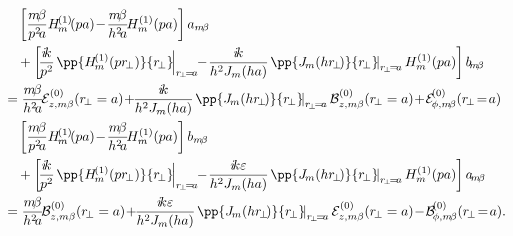 \documentclass[]{report}
\begin{document}
\begin{align}
&\quad \left[\frac{m\! \beta}{p^2\! a} H\!_m^{(1)}\!(pa) \!-\! \frac{m\! \beta}{h^2\! a}\!H_m^{(1)}(pa) \right] a_{m\!\beta}\nonumber\\
&\quad +\left[\! \frac{i\!k}{p^2}\! \left. \pp{H\!_m^{( 1 )}(p r\!_\perp)}{r\!_\perp}\! \right|_{r\!_\perp\! =\! a}\!\!-\! \frac{i\!k}{h^2J_m(ha)}\! \left. \pp{J\!_m(h r\!_\perp \!)}{r\!_\perp}\! \right|_{r\!_\perp\! =\! a} H_m^{(1)}(pa) \right]b\!_{m\!\beta} \nonumber\\
&= \frac{m\! \beta}{h^2\! a}\! \mathcal{E}_{z,m\beta}^{(0)}(r\!_\perp =a ) \!+\! \! \frac{i\!k}{h^2J_m(ha)}\! \left. \pp{J\!_m(h r\!_\perp \!)}{r\!_\perp}\! \right|_{r\!_\perp\! =\! a}\mathcal{B}_{z,m\beta}^{(0)}(r\!_\perp =a )  \!+\!\mathcal{E}\! _{\phi,m\! \beta}^{(0)}(r\!_\perp\! =\! a )\\
&\quad \left[\frac{m\! \beta}{p^2\! a} H\!_m^{(1)}\!(pa) \!-\! \frac{m\! \beta}{h^2\! a}\!H_m^{(1)}(pa) \right] b_{m\!\beta}\nonumber\\
&\quad +\left[\! \frac{i\!k}{p^2}\! \left. \pp{H\!_m^{( 1 )}(p r\!_\perp)}{r\!_\perp}\! \right|_{r\!_\perp\! =\! a}\!\!-\! \frac{i\!k\varepsilon}{h^2J_m(ha)}\! \left. \pp{J\!_m(h r\!_\perp \!)}{r\!_\perp}\! \right|_{r\!_\perp\! =\! a} H_m^{(1)}(pa) \right]a\!_{m\!\beta} \nonumber\\
&= \frac{m\! \beta}{h^2\! a}\! \mathcal{B}_{z,m\beta}^{(0)}(r\!_\perp =a ) \!+\! \! \frac{i\!k\varepsilon}{h^2J_m(ha)}\! \left. \pp{J\!_m(h r\!_\perp \!)}{r\!_\perp}\! \right|_{r\!_\perp\! =\! a}\mathcal{E}_{z,m\beta}^{(0)}(r\!_\perp =a )  \!-\!\mathcal{B}\! _{\phi,m\! \beta}^{(0)}(r\!_\perp\! =\! a ).
\end{align}
\end{document}
